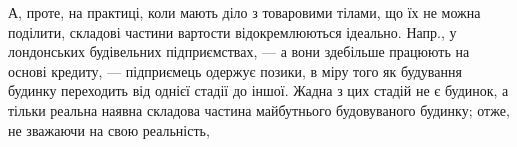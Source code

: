 А, проте, на практиці, коли мають діло з товаровими тілами, що
їх не можна поділити, складові частини вартости відокремлюються
ідеально. Напр., у лондонських будівельних підприємствах, — а вони здебільше
працюють на основі кредиту, — підприємець одержує позики,
в міру того як будування будинку переходить від однієї стадії до іншої.
Жадна з цих стадій не є будинок, а тільки реальна наявна складова частина
майбутнього будовуваного будинку; отже, не зважаючи на свою реальність,
\parbreak{}  %
